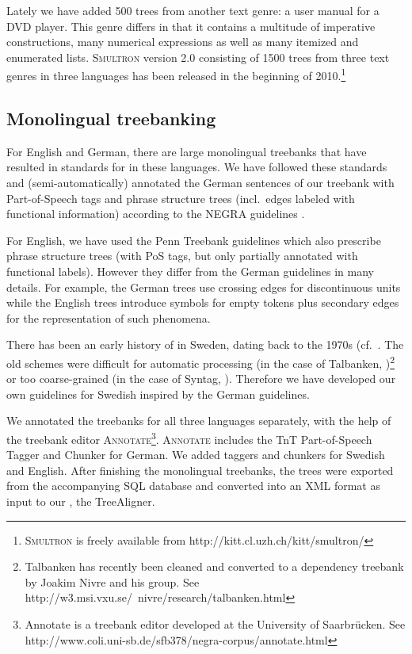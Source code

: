 \documentclass[output=paper]{LSP/langsci}
\begin{document}
Lately we have added 500 trees from another text genre: a user manual for a DVD player. This genre differs in that it contains a multitude of imperative constructions, many numerical expressions as well as many itemized and enumerated lists. S\textsc{multron} version 2.0 consisting of 1500 trees from three text genres in three languages has been released in the beginning of 2010.\footnote{S\textsc{multron} is freely available from http://kitt.cl.uzh.ch/kitt/smultron/}

\subsection{Monolingual treebanking}\label{sec:volk:2.1}

For English and German, there are large monolingual treebanks that have resulted in standards for  in these languages. We have followed these standards and (semi-automatically) annotated the German sentences of our treebank with Part-of-Speech tags and phrase structure trees (incl.~edges labeled with functional information) according to the NEGRA guidelines \citep{BrantsEtAl1997}. 

For English, we have used the Penn Treebank guidelines which also prescribe phrase structure trees (with PoS tags, but only partially annotated with functional labels). However they differ from the German guidelines in many details. For example, the German trees use crossing edges for discontinuous units while the English trees introduce symbols for empty tokens plus secondary edges for the representation of such phenomena. 

There has been an early history of  in Sweden, dating back to the 1970s (cf.~\citealt{Nivre2002}. The old  schemes were difficult for automatic processing (in the case of Talbanken, \citealt{Teleman1974})\footnote{Talbanken has recently been cleaned and converted to a dependency treebank by Joakim Nivre and his group. See http://w3.msi.vxu.se/~nivre/research/talbanken.html} or too coarse-grained (in the case of Syntag, \citealt{Järborg1986}). Therefore we have developed our own  guidelines for Swedish inspired by the German guidelines. 

We annotated the treebanks for all three languages separately, with the help of the treebank editor A\textsc{nnotate}\footnote{Annotate is a treebank editor developed at the University of Saarbrücken. See http://www.coli.uni-sb.de/sfb378/negra-corpus/annotate.html}. A\textsc{nnotate} includes the TnT Part-of-Speech Tagger and Chunker for German. We added taggers and chunkers for Swedish and English. After finishing the monolingual treebanks, the trees were exported from the accompanying SQL database and converted into an XML format as input to our , the TreeAligner. 
\end{document}
